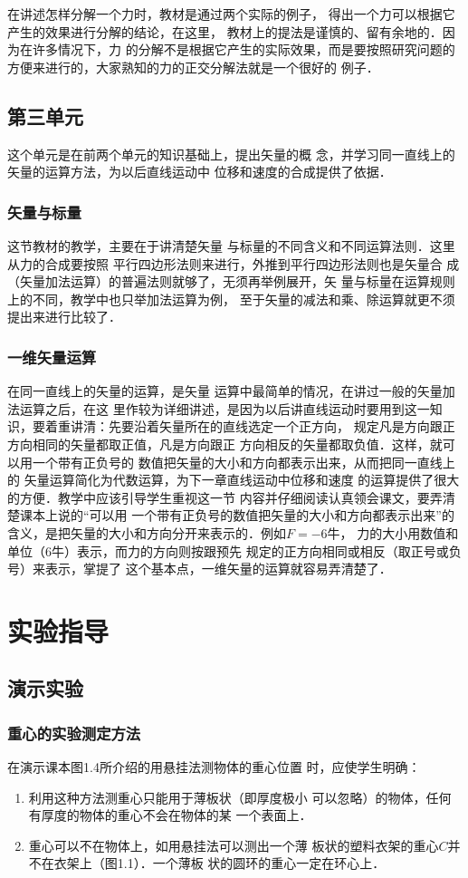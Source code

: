 在讲述怎样分解一个力时，教材是通过两个实际的例子，
得出一个力可以根据它产生的效果进行分解的结论，在这里，
教材上的提法是谨慎的、留有余地的．因为在许多情况下，力
的分解不是根据它产生的实际效果，而是要按照研究问题的
方便来进行的，大家熟知的力的正交分解法就是一个很好的
例子．

\subsection{第三单元}
这个单元是在前两个单元的知识基础上，提出矢量的概
念，并学习同一直线上的矢量的运算方法，为以后直线运动中
位移和速度的合成提供了依据．

\subsubsection{矢量与标量} 
这节教材的教学，主要在于讲清楚矢量
与标量的不同含义和不同运算法则．这里从力的合成要按照
平行四边形法则来进行，外推到平行四边形法则也是矢量合
成（矢量加法运算）的普遍法则就够了，无须再举例展开，矢
量与标量在运算规则上的不同，教学中也只举加法运算为例，
至于矢量的减法和乘、除运算就更不须提出来进行比较了．

\subsubsection{一维矢量运算}  在同一直线上的矢量的运算，是矢量
运算中最简单的情况，在讲过一般的矢量加法运算之后，在这
里作较为详细讲述，是因为以后讲直线运动时要用到这一知
识，要着重讲清：先要沿着矢量所在的直线选定一个正方向，
规定凡是方向跟正方向相同的矢量都取正值，凡是方向跟正
方向相反的矢量都取负值．这样，就可以用一个带有正负号的
数值把矢量的大小和方向都表示出来，从而把同一直线上的
矢量运算简化为代数运算，为下一章直线运动中位移和速度
的运算提供了很大的方便．教学中应该引导学生重视这一节
内容并仔细阅读认真领会课文，要弄清楚课本上说的“可以用
一个带有正负号的数值把矢量的大小和方向都表示出来”的
含义，是把矢量的大小和方向分开来表示的．例如$F=-6$牛，
力的大小用数值和单位（6牛）表示，而力的方向则按跟预先
规定的正方向相同或相反（取正号或负号）来表示，掌提了
这个基本点，一维矢量的运算就容易弄清楚了．

\section{实验指导}
\subsection{演示实验}
\subsubsection{重心的实验测定方法}
在演示课本图1.4所介绍的用悬挂法测物体的重心位置
时，应使学生明确：
\begin{enumerate}
\item 利用这种方法测重心只能用于薄板状（即厚度极小
可以忽略）的物体，任何有厚度的物体的重心不会在物体的某
一个表面上．
\item 重心可以不在物体上，如用悬挂法可以测出一个薄
板状的塑料衣架的重心$C$并不在衣架上（图1.1）．一个薄板
状的圆环的重心一定在环心上．
\end{enumerate}

